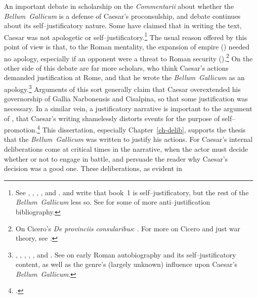 \documentclass[12pt,letterpaper,oneside,final]{memoir}
\begin{document}
An important debate in scholarship on the \emph{Commentarii} about whether the \emph{Bellum~Gallicum} is a defense of Caesar's proconsulship, and debate continues about its self--justificatory nature. Some have claimed that in writing the text, Caesar was not apologetic or self--justificatory.\footnote{See \textcite[esp.~p.~923]{collins1972}, \textcite[178--183]{brunt1978}, \textcite[27--29]{hall1998}, \textcite[73--74]{lieberg1998}, and \textcite[saying Caesar needed minimal justification]{brown1999}. \textcite[22--25]{klotz1910} and \textcite[esp.~pp.~216--217]{schlicher1936} write that book~1 is self--justificatory, but the rest of the \emph{Bellum~Gallicum} less so. See \textcite[p.~243 n.~2]{riggsby2006} for some of more anti--justification bibliography.} The usual reason offered by this point of view is that, to the Roman mentality, the expansion of empire (\cite[926--927]{collins1972}) needed no apology, especially if an opponent were a threat to Roman security (\cite{brunt1978}).\footnote{On Cicero's \emph{De provinciis consularibus}: . For more on Cicero and just war theory, see \textcite[158--161]{riggsby2006}.} On the other side of this debate are far more scholars, who think Caesar's actions demanded justification at Rome, and that he wrote the \emph{Bellum~Gallicum} as an apology.\footnote{\textcite[111--133]{rambaud1966}, \textcite[esp.~pp.~184--185]{gardner1983}, \textcite[246--251]{meier1995}, \textcite[pp.~10, 33, and 144--146]{batstonedamon2006}, \textcite[175--189]{riggsby2006}, and \textcite[247--251]{vasaly2009}. See \textcite[195--198]{marincola1997} on early Roman autobiography and its self--justificatory content, as well as the genre's (largely unknown) influence upon Caesar's \emph{Bellum~Gallicum}.} Arguments of this sort generally claim that Caesar overextended his governorship of Gallia Narbonensis and Cisalpina, so that some justification was necessary. In a similar vein, a justificatory narrative is important to the argument of \textcite{rambaud1966}, that Caesar's writing shamelessly distorts events for the purpose of self--promotion.\footnote{.} This dissertation, especially Chapter~\ref{ch-delib}, supports the thesis that the \emph{Bellum~Gallicum} was written to justify his actions. For Caesar's internal deliberations come at critical times in the narrative, when the actor must decide whether or not to engage in battle, and persuade the reader why Caesar's decision was a good one. These deliberations, as evident in 
\end{document}
